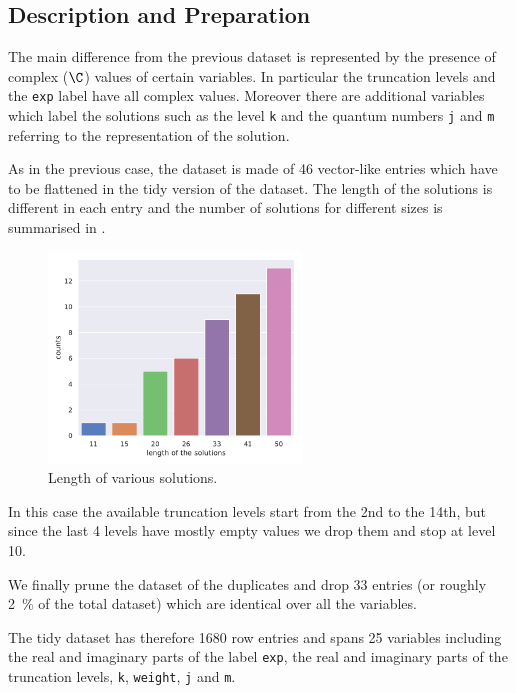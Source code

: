 \subsection{Description and Preparation}

The main difference from the previous dataset is represented by the presence of complex ($\C$) values of certain variables.
In particular the truncation levels and the \texttt{exp} label have all complex values.
Moreover there are additional variables which label the solutions such as the level \texttt{k} and the quantum numbers \texttt{j} and \texttt{m} referring to the  representation of the solution.

As in the previous case, the dataset is made of 46 vector-like entries which have to be flattened in the tidy version of the dataset.
The length of the solutions is different in each entry and the number of solutions for different sizes is summarised in .

\begin{figure}[htbp]
  \centering
  \includegraphics[width=0.6\textwidth]{img/re_sol_length}
  \caption{Length of various solutions.}
  \label{fig:wzw:length}
\end{figure}

In this case the available truncation levels start from the 2nd to the 14th, but since the last 4 levels have mostly empty values we drop them and stop at level 10.

We finally prune the dataset of the duplicates and drop 33 entries (or roughly \SI{2}{\percent} of the total dataset) which are identical over all the variables.

The tidy dataset has therefore 1680 row entries and spans 25 variables including the real and imaginary parts of the label \texttt{exp}, the real and imaginary parts of the truncation levels, \texttt{k}, \texttt{weight}, \texttt{j} and \texttt{m}.


